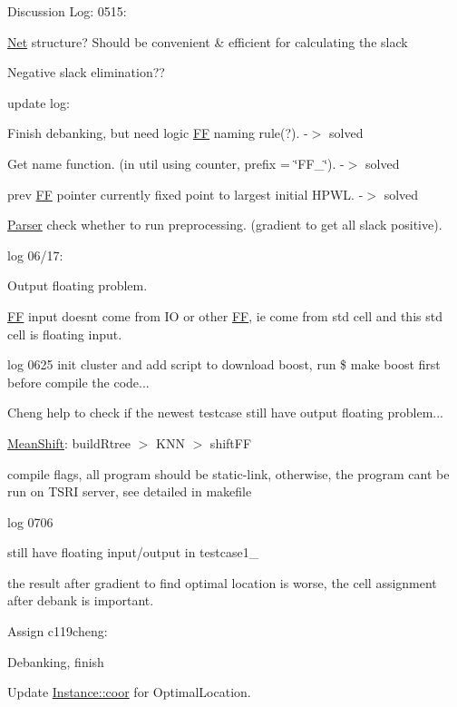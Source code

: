 \begin{DoxyItemize}
\item Discussion Log\+: 0515\+:
\begin{DoxyItemize}
\item \mbox{\hyperlink{classNet}{Net}} structure? Should be convenient \& efficient for calculating the slack
\item Negative slack elimination??
\end{DoxyItemize}
\item update log\+:
\begin{DoxyItemize}
\item Finish debanking, but need logic \mbox{\hyperlink{classFF}{FF}} naming rule(?). -\/$>$ solved
\item Get name function. (in util using counter, prefix = \char`\"{}\+FF\+\_\+\char`\"{}). -\/$>$ solved
\item prev \mbox{\hyperlink{classFF}{FF}} pointer currently fixed point to largest initial HPWL. -\/$>$ solved
\item \mbox{\hyperlink{classParser}{Parser}} check whether to run preprocessing. (gradient to get all slack positive).
\end{DoxyItemize}
\item log 06/17\+:
\begin{DoxyItemize}
\item Output floating problem.
\item \mbox{\hyperlink{classFF}{FF}} input doesn\textquotesingle{}t come from IO or other \mbox{\hyperlink{classFF}{FF}}, ie come from std cell and this std cell is floating input.
\end{DoxyItemize}
\item log 0625 init cluster and add script to download boost, run \$ make boost first before compile the code...
\begin{DoxyItemize}
\item Cheng help to check if the newest testcase still have output floating problem...
\item \mbox{\hyperlink{classMeanShift}{Mean\+Shift}}\+: build\+Rtree $>$ KNN $>$ shift\+FF
\item compile flags, all program should be static-\/link, otherwise, the program can\textquotesingle{}t be run on TSRI server, see detailed in makefile
\end{DoxyItemize}
\item log 0706
\begin{DoxyItemize}
\item still have floating input/output in testcase1\+\_
\item the result after gradient to find optimal location is worse, the cell assignment after debank is important.
\end{DoxyItemize}
\end{DoxyItemize}

Assign c119cheng\+:
\begin{DoxyItemize}
\item Debanking, finish
\item Update \mbox{\hyperlink{classInstance_a725371da2335a65476b1803e328a7861}{Instance\+::coor}} for Optimal\+Location. 
\end{DoxyItemize}